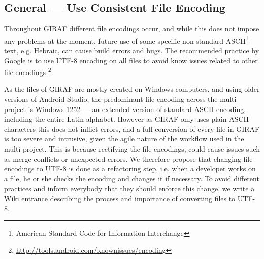 \subsection{General --- Use Consistent File Encoding}
Throughout GIRAF different file encodings occur, and while this does not impose any problems at the moment, future use of some specific non standard ASCII\footnote{American Standard Code for Information Interchange} text, e.g. Hebraic, can cause build errors and bugs.
The recommended practice by Google is to use UTF-8 encoding on all files to avoid know issues related to other file encodings \footnote{\url{http://tools.android.com/knownissues/encoding}}.

As the files of GIRAF are mostly created on Windows computers, and using older versions of Android Studio, the predominant file encoding across the multi project is Windows-1252 --- an extended version of standard ASCII encoding, including the entire Latin alphabet.
However as GIRAF only uses plain ASCII characters this does not inflict errors, and a full conversion of every file in GIRAF is too severe and intrusive, given the agile nature of the workflow used in the multi project.
This is because rectifying the file encodings, could cause issues such as merge conflicts or unexpected errors.
We therefore propose that changing file encodings to UTF-8 is done as a refactoring step, i.e. when a developer works on a file, he or she checks the encoding and changes it if necessary.
To avoid different practices and inform everybody that they should enforce this change, we write a Wiki entrance describing the process and importance of converting files to UTF-8.
